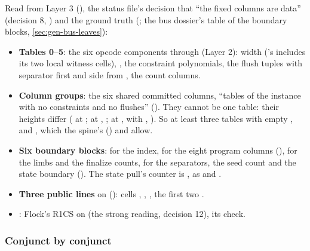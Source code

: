 Read from Layer 3 (), the status file's decision that \enquote{the fixed
columns are  data} (decision 8, ) and the
ground truth (; the bus dossier's table of the boundary blocks,
\cref{sec:gen-bus-leaves}):
\begin{itemize}
\item \textbf{Tables 0--5}: the six opcode components through  (Layer 2):
  width  ('s includes its two local witness cells),
  , the constraint polynomials, the flush tuples with separator
   first and side from , the count columns.
\item \textbf{Column groups}: the six shared committed columns, \enquote{tables of the instance
  with no constraints and no flushes} (). They cannot be one table: their heights
  differ ( at ;  at
  , ;  at ,
   with , ). So at least three tables
  with empty ,  and , which the spine's 
  () and  allow.
\item \textbf{Six boundary blocks}:  for the index,
   for the eight program columns
  (),  for the limbs and the finalize counts,
   for the separators, the seed count  and the state boundary
  (). The state pull's counter is , as
   and .
\item \textbf{Three public lines} on  (): cells
  , , , the first two .
\item \textbf{}: Flock's R1CS on  (the strong reading, decision 12),
   its check.
\end{itemize}

\subsubsection{Conjunct by conjunct}\label{sec:gen-boundary-conjuncts}

